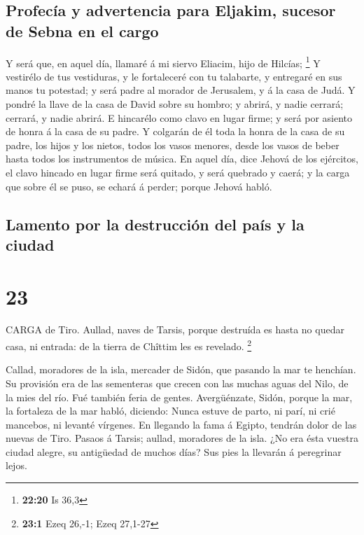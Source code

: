\hypertarget{profecuxeda-y-advertencia-para-eljakim-sucesor-de-sebna-en-el-cargo}{%
\subsection{Profecía y advertencia para Eljakim, sucesor de Sebna en el
cargo}\label{profecuxeda-y-advertencia-para-eljakim-sucesor-de-sebna-en-el-cargo}}

 Y será que, en aquel día, llamaré á mi siervo Eliacim,
hijo de Hilcías; \footnote{\textbf{22:20} Is 36,3}  Y
vestirélo de tus vestiduras, y le fortaleceré con tu talabarte, y
entregaré en sus manos tu potestad; y será padre al morador de
Jerusalem, y á la casa de Judá.  Y pondré la llave de la
casa de David sobre su hombro; y abrirá, y nadie cerrará; cerrará, y
nadie abrirá.  E hincarélo como clavo en lugar firme; y
será por asiento de honra á la casa de su padre.  Y
colgarán de él toda la honra de la casa de su padre, los hijos y los
nietos, todos los vasos menores, desde los vasos de beber hasta todos
los instrumentos de música.  En aquel día, dice Jehová de
los ejércitos, el clavo hincado en lugar firme será quitado, y será
quebrado y caerá; y la carga que sobre él se puso, se echará á perder;
porque Jehová habló.

\hypertarget{lamento-por-la-destrucciuxf3n-del-pauxeds-y-la-ciudad}{%
\subsection{Lamento por la destrucción del país y la
ciudad}\label{lamento-por-la-destrucciuxf3n-del-pauxeds-y-la-ciudad}}

\hypertarget{section-22}{%
\section{23}\label{section-22}}

 CARGA de Tiro. Aullad, naves de Tarsis, porque destruída es
hasta no quedar casa, ni entrada: de la tierra de Chîttim les es
revelado. \footnote{\textbf{23:1} Ezeq 26,-1; Ezeq 27,1-27}

 Callad, moradores de la isla, mercader de Sidón, que
pasando la mar te henchían.  Su provisión era de las
sementeras que crecen con las muchas aguas del Nilo, de la mies del río.
Fué también feria de gentes.  Avergüénzate, Sidón, porque la
mar, la fortaleza de la mar habló, diciendo: Nunca estuve de parto, ni
parí, ni crié mancebos, ni levanté vírgenes.  En llegando la
fama á Egipto, tendrán dolor de las nuevas de Tiro.  Pasaos
á Tarsis; aullad, moradores de la isla.  ¿No era ésta
vuestra ciudad alegre, su antigüedad de muchos días? Sus pies la
llevarán á peregrinar lejos.

